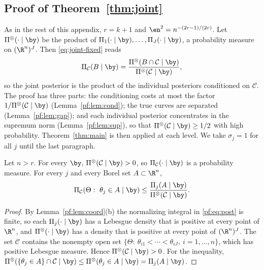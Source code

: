 \subsection{Proof of Theorem~\ref{thm:joint}}\label{pf:sec:joint}

As in the rest of this appendix, $r=k+1$ and $\en^2=n^{-(2r-1)/(2r)}$. Let $\Pi^{\otimes}(\cdot\mid\by)$ be the product of $\Pi_1(\cdot\mid\by),\dots,\Pi_J(\cdot\mid\by)$, a probability measure on $(\R^n)^J$. Then \eqref{eq:joint-fixed} reads
\[
\Pi_{\mathcal C}(B\mid\by)=\frac{\Pi^{\otimes}(B\cap\mathcal C\mid\by)}{\Pi^{\otimes}(\mathcal C\mid\by)} ,
\]
so the joint posterior is the product of the individual posteriors conditioned on $\mathcal C$. The proof has three parts: the conditioning costs at most the factor $1/\Pi^{\otimes}(\mathcal C\mid\by)$ (Lemma~\ref{pf:lem:cond}); the true curves are separated (Lemma~\ref{pf:lem:gap}); and each individual posterior concentrates in the supremum norm (Lemma~\ref{pf:lem:sup}), so that $\Pi^{\otimes}(\mathcal C\mid\by)\ge1/2$ with high probability. Theorem~\ref{thm:main} is then applied at each level. We take $\sigma_j=1$ for all $j$ until the last paragraph.

\begin{lemma}[conditioning]\label{pf:lem:cond}
Let $n>r$. For every $\by$, $\Pi^{\otimes}(\mathcal C\mid\by)>0$, so $\Pi_{\mathcal C}(\cdot\mid\by)$ is a probability measure. For every $j$ and every Borel set $A\subset\R^n$,
\[
\Pi_{\mathcal C}(\Theta:\ \theta_j\in A\mid\by)\le\frac{\Pi_j(A\mid\by)}{\Pi^{\otimes}(\mathcal C\mid\by)} .
\]
\end{lemma}

\begin{proof}
By Lemma~\ref{pf:lem:coord}(b) the normalizing integral in \eqref{pf:eq:post} is finite, so each $\Pi_j(\cdot\mid\by)$ has a Lebesgue density that is positive at every point of $\R^n$, and $\Pi^{\otimes}(\cdot\mid\by)$ has a density that is positive at every point of $(\R^n)^J$. The set $\mathcal C$ contains the nonempty open set $\{\Theta:\ \theta_{i1}<\cdots<\theta_{iJ},\ i=1,\dots,n\}$, which has positive Lebesgue measure. Hence $\Pi^{\otimes}(\mathcal C\mid\by)>0$. For the inequality, $\Pi^{\otimes}(\{\theta_j\in A\}\cap\mathcal C\mid\by)\le\Pi^{\otimes}(\theta_j\in A\mid\by)=\Pi_j(A\mid\by)$.
\end{proof}

